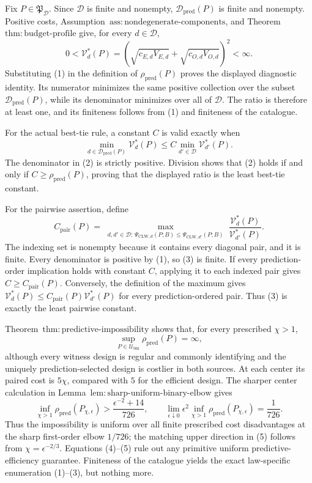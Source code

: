 Fix \(P\in\mathfrak P_{\mathcal D}\). Since \(\mathcal D\) is finite and nonempty, \(\mathcal D_{\mathrm{pred}}(P)\) is finite and nonempty. Positive costs, Assumption~\(\mathrm{ass{:}nondegenerate\text{-}components}\), and Theorem~\(\mathrm{thm{:}budget\text{-}profile}\) give, for every \(d\in\mathcal D\),
\[
 0<\mathcal V_d^*(P)
 =\left(\sqrt{c_{E,d}V_{E,d}}+
         \sqrt{c_{O,d}V_{O,d}}\right)^2<\infty.       \tag{1}
\]
Substituting (1) in the definition of \(\rho_{\mathrm{pred}}(P)\) proves the displayed diagnostic identity. Its numerator minimizes the same positive collection over the subset \(\mathcal D_{\mathrm{pred}}(P)\), while its denominator minimizes over all of \(\mathcal D\). The ratio is therefore at least one, and its finiteness follows from (1) and finiteness of the catalogue.

For the actual best-tie rule, a constant \(C\) is valid exactly when
\[
 \min_{d\in\mathcal D_{\mathrm{pred}}(P)}\mathcal V_d^*(P)
 \le C\min_{d'\in\mathcal D}\mathcal V_{d'}^*(P).    \tag{2}
\]
The denominator in (2) is strictly positive. Division shows that (2) holds if and only if \(C\ge\rho_{\mathrm{pred}}(P)\), proving that the displayed ratio is the least best-tie constant.

For the pairwise assertion, define
\[
 C_{\mathrm{pair}}(P)=
 \max_{\substack{d,d'\in\mathcal D:\,
 \Psi_{\mathrm{CLW},d}(P;B)
 \le\Psi_{\mathrm{CLW},d'}(P;B)}}
 \frac{\mathcal V_d^*(P)}{\mathcal V_{d'}^*(P)}.      \tag{3}
\]
The indexing set is nonempty because it contains every diagonal pair, and it is finite. Every denominator is positive by (1), so (3) is finite. If every prediction-order implication holds with constant \(C\), applying it to each indexed pair gives \(C\ge C_{\mathrm{pair}}(P)\). Conversely, the definition of the maximum gives \(\mathcal V_d^*(P)\le C_{\mathrm{pair}}(P)\mathcal V_{d'}^*(P)\) for every prediction-ordered pair. Thus (3) is exactly the least pairwise constant.

Theorem~\(\mathrm{thm{:}predictive\text{-}impossibility}\) shows that, for every prescribed \(\chi>1\),
\[
 \sup_{P\in\mathcal U_{\mathrm{bin}}}\rho_{\mathrm{pred}}(P)=\infty, \tag{4}
\]
although every witness design is regular and commonly identifying and the uniquely prediction-selected design is costlier in both sources. At each center its paired cost is \(5\chi\), compared with \(5\) for the efficient design. The sharper center calculation in Lemma~\(\mathrm{lem{:}sharp\text{-}uniform\text{-}binary\text{-}elbow}\) gives
\[
 \inf_{\chi>1}\rho_{\mathrm{pred}}(P_{\chi,\epsilon})
 >\frac{\epsilon^{-2}+14}{726},
 \qquad
 \lim_{\epsilon\downarrow0}\epsilon^2
 \inf_{\chi>1}\rho_{\mathrm{pred}}(P_{\chi,\epsilon})
 =\frac1{726}.                                         \tag{5}
\]
Thus the impossibility is uniform over all finite prescribed cost disadvantages at the sharp first-order elbow \(1/726\); the matching upper direction in (5) follows from \(\chi=\epsilon^{-2/3}\). Equations (4)--(5) rule out any primitive uniform predictive-efficiency guarantee. Finiteness of the catalogue yields the exact law-specific enumeration (1)--(3), but nothing more.